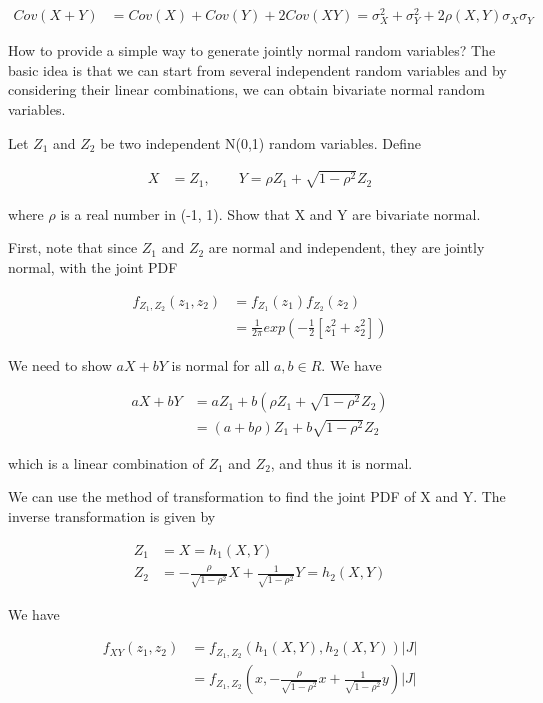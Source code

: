 \begin{align*}
	Cov(X+Y) &= Cov(X) + Cov(Y) + 2Cov(XY) = \sigma^2_X + \sigma^2_Y + 2 \rho(X,Y) \sigma_X \sigma_Y
\end{align*}

How to provide a simple way to generate jointly normal random variables? The basic idea is that we can start from several independent random variables and by considering their linear combinations, we can obtain bivariate normal random variables. 

Let $Z_1$ and $Z_2$ be two independent N(0,1) random variables. Define

\begin{align*}
	X &= Z_1, \qquad Y= \rho Z_1 + \sqrt{1-\rho^2} Z_2
\end{align*}

where $\rho$ is a real number in (-1, 1). Show that X and Y are bivariate normal.

First, note that since $Z_1$ and $Z_2$ are normal and independent, they are jointly normal, with the joint PDF

\begin{align*}
	f_{Z_1, Z_2} (z_1, z_2) &= f_{Z_1}(z_1) f_{Z_2}(z_2) \\
	&= \frac{1}{2 \pi} exp \left(-\frac{1}{2} [z_1^2 + z_2^2] \right)
\end{align*}

We need to show $aX+bY$ is normal for all $a,b \in R$. We have

\begin{align*}
	aX + bY &= a Z_1 + b(\rho Z_1 + \sqrt{1- \rho^2} Z_2) \\
	&= (a + b\rho) Z_1 + b \sqrt{1- \rho^2} Z_2
\end{align*}

which is a linear combination of $Z_1$ and $Z_2$, and thus it is normal.


We can use the method of transformation to find the joint PDF of X and Y. The inverse transformation is given by

\begin{align*}
	Z_1 &= X = h_1(X, Y) \\
	Z_2 &= -\frac{\rho}{\sqrt{1-\rho^2}} X + \frac{1}{\sqrt{1-\rho^2}} Y = h_2(X, Y)
\end{align*}

We have

\begin{align*}
	f_{XY}(z_1, z_2) &= f_{Z_1, Z_2} (h_1(X, Y), h_2(X, Y)) |J|\\
	&= f_{Z_1, Z_2} (x, -\frac{\rho}{\sqrt{1-\rho^2}} x + \frac{1}{\sqrt{1-\rho^2}} y) |J|
\end{align*}


